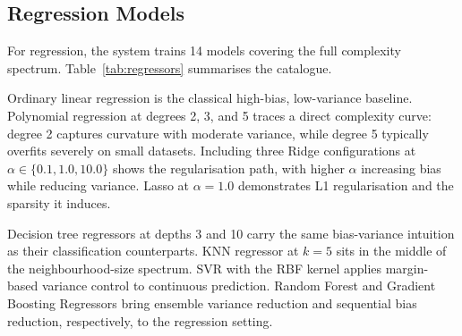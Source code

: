 \documentclass[conference]{IEEEtran}
\begin{document}
\subsection{Regression Models}

For regression, the system trains 14 models covering the full complexity spectrum. Table~\ref{tab:regressors} summarises the catalogue.

Ordinary linear regression is the classical high-bias, low-variance baseline. Polynomial regression at degrees 2, 3, and 5 traces a direct complexity curve: degree 2 captures curvature with moderate variance, while degree 5 typically overfits severely on small datasets. Including three Ridge configurations at $\alpha \in \{0.1, 1.0, 10.0\}$ shows the regularisation path, with higher $\alpha$ increasing bias while reducing variance. Lasso at $\alpha=1.0$ demonstrates L1 regularisation and the sparsity it induces.

Decision tree regressors at depths 3 and 10 carry the same bias-variance intuition as their classification counterparts. KNN regressor at $k=5$ sits in the middle of the neighbourhood-size spectrum. SVR with the RBF kernel applies margin-based variance control to continuous prediction. Random Forest and Gradient Boosting Regressors bring ensemble variance reduction and sequential bias reduction, respectively, to the regression setting.
\end{document}
